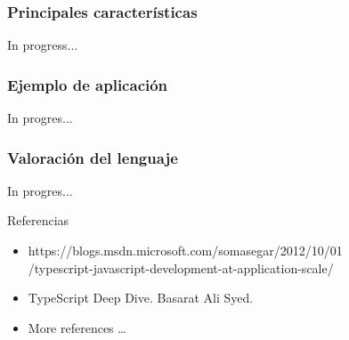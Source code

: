 \documentclass{beamer}
\begin{document}
  \begin{frame}
\frametitle{Principales características}
In progress...
\end{frame}

\begin{frame}
\frametitle{Ejemplo de aplicación}
In progres...
\end{frame}

\begin{frame}
\frametitle{Valoración del lenguaje}
In progres...
\end{frame}

\begin{frame}{Referencias}
\begin{itemize}  
	\item https://blogs.msdn.microsoft.com/somasegar/2012/10/01 \\ /typescript-javascript-development-at-application-scale/
	\item TypeScript Deep Dive. Basarat Ali Syed. 
	\item More references \ldots 
\end{itemize}
\end{frame}
\end{document}

